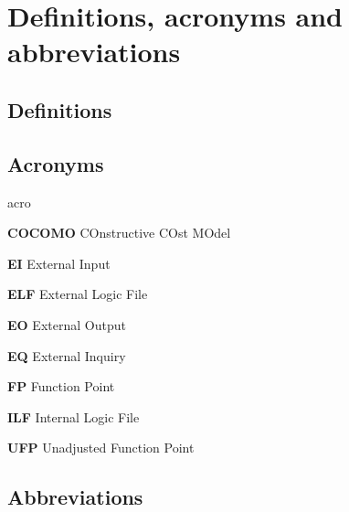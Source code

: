 \section{Definitions, acronyms and abbreviations}

\subsection{Definitions}

\subsection{Acronyms}
	\begin{labeling}{acro}
		\item[\textbf{COCOMO}] COnstructive COst MOdel
		\item[\textbf{EI}] External Input
		\item[\textbf{ELF}] External Logic File
		\item[\textbf{EO}] External Output
		\item[\textbf{EQ}] External Inquiry
		\item[\textbf{FP}] Function Point
		\item[\textbf{ILF}] Internal Logic File
		\item[\textbf{UFP}] Unadjusted Function Point
	\end{labeling}

\subsection{Abbreviations}
